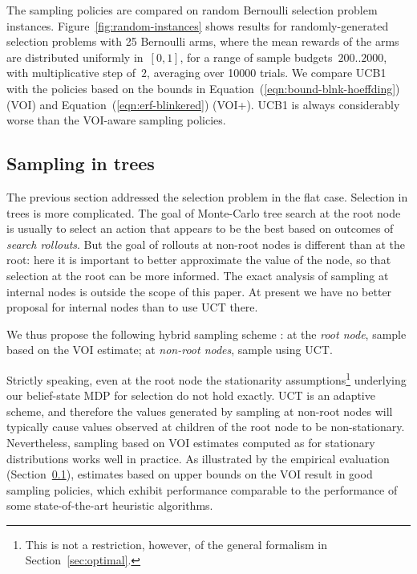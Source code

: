 The sampling policies are compared on random Bernoulli
selection problem instances. Figure~\ref{fig:random-instances} shows results for
randomly-generated selection problems with 25 Bernoulli arms, where
the mean rewards of the arms are distributed uniformly in~$[0,1]$, 
for a range of sample budgets~$200..2000$, with multiplicative
step of~$2$, averaging over 10000 trials.  We compare UCB1 with the 
policies based on the bounds in
Equation~(\ref{eqn:bound-blnk-hoeffding}) (VOI) and
Equation~(\ref{eqn:erf-blinkered}) (VOI+).
UCB1 is always considerably worse than the VOI-aware sampling policies.





\subsection{Sampling in trees}
\label{sec:empirical-evaluation}\label{mcts-section}

The previous section addressed the selection problem in the flat case.
Selection in trees is more complicated.  The goal of Monte-Carlo tree 
search \cite{Chaslot.montecarlo} at the root node 
is usually to select an action that appears to be the best based on outcomes
of \textit{search rollouts}.
But the goal of rollouts at non-root nodes
is different than at the root: here it is important to better approximate the
value of the node, so that selection at the root can be more informed. The exact analysis
of sampling at internal nodes is outside the scope of this paper. At present we 
have no better proposal for internal nodes than to use UCT there.

We thus propose the following hybrid sampling scheme \cite{TolpinShimony.mcts}: 
	at the \emph{root node}, sample based on the VOI estimate;
	at \emph{non-root nodes}, sample using UCT.

Strictly speaking, even at the root node the stationarity assumptions\footnote{This is not a restriction,
however, of the general formalism in Section~\ref{sec:optimal}.} 
underlying our belief-state
MDP for selection do not hold exactly. UCT is an adaptive scheme, and therefore the values
generated by sampling at non-root nodes will typically cause values observed at
children of the root node to be non-stationary. 
Nevertheless, sampling based on VOI estimates
computed as for stationary distributions works well in
practice. As illustrated
by the empirical evaluation (Section~\ref{sec:empirical-evaluation}),
estimates based on upper bounds on the VOI result in good sampling
policies, which exhibit performance comparable to the performance of
some state-of-the-art heuristic algorithms.


